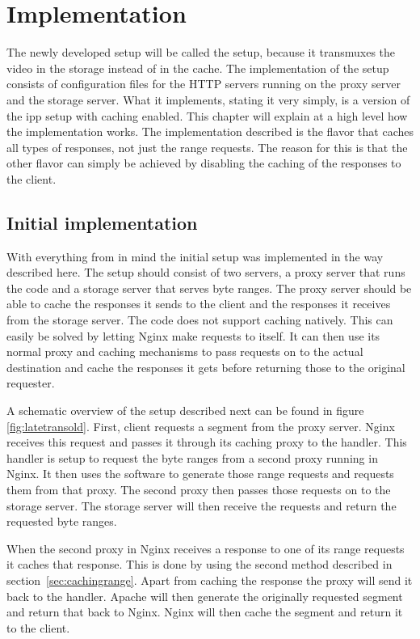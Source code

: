 \documentclass[twoside,openright]{uva-bachelor-thesis}
\begin{document}
\chapter{Implementation}
The newly developed setup will be called the \lt setup, because it transmuxes
the video in the storage instead of in the cache. The implementation of the \lt
setup consists of configuration files for the HTTP servers running on the proxy
server and the storage server. What it implements, stating it very simply, is a
version of the \gls{ipp} setup with caching enabled. This chapter will explain
at a high level how the implementation works. The implementation described is
the flavor that caches all types of responses, not just the range requests. The
reason for this is that the other flavor can simply be achieved by disabling the
caching of the responses to the client.


\section{Initial implementation}\label{sec:initimplement}
With everything from  in mind the initial \lt setup was
implemented in the way described here. The setup should consist of two servers,
a proxy server that runs the \usp code and a storage server that serves byte
ranges. The proxy server should be able to cache the responses it sends to the
client and the responses it receives from the storage server. The \usp code does
not support caching natively. This can easily be solved by letting Nginx make
requests to itself. It can then use its normal proxy and caching mechanisms to
pass requests on to the actual destination and cache the responses it gets
before returning those to the original requester.

A schematic overview of the setup described next can be found in figure
\vref{fig:latetransold}. First, client requests a segment from the proxy server.
Nginx receives this request and passes it through its caching proxy to the
\ipplong handler. This handler is setup to request the byte ranges from a second
proxy running in Nginx. It then uses the \usp software to generate those range
requests and requests them from that proxy. The second proxy then passes those
requests on to the storage server. The storage server will then receive the
requests and return the requested byte ranges.

When the second proxy in Nginx receives a response to one of its range requests
it caches that response. This is done by using the second method described in
section~\ref{sec:cachingrange}. Apart from caching the response the proxy will
send it back to the \ipplong handler. Apache will then generate the originally requested
segment and return that back to Nginx.  Nginx will then cache the segment and
return it to the client.
\end{document}
